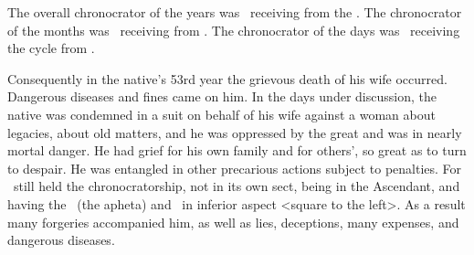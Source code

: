 The overall chronocrator of the years was \Mars\, receiving from the \Moon. The chronocrator of the months was \Saturn\, receiving from \Mars. The chronocrator of the days was \Venus\, receiving the cycle from \Saturn. 

Consequently in the native’s 53rd year the grievous death of his wife occurred. Dangerous diseases and fines came on him. In the days under discussion, the native was condemned in a suit on behalf of his wife against a woman about legacies, about old matters, and he was oppressed by the great and was in nearly mortal danger. He had grief for his own family and for others’, so great as to turn to despair.
He was entangled in other precarious actions subject to penalties. For \Saturn\, still held the chronocratorship, not in its own sect, being in the Ascendant, and having the \Moon\, (the apheta) and \Mercury\, in inferior aspect <square to the left>. As a result many forgeries accompanied him, as well as lies, deceptions, many expenses, and dangerous diseases.


\newpage